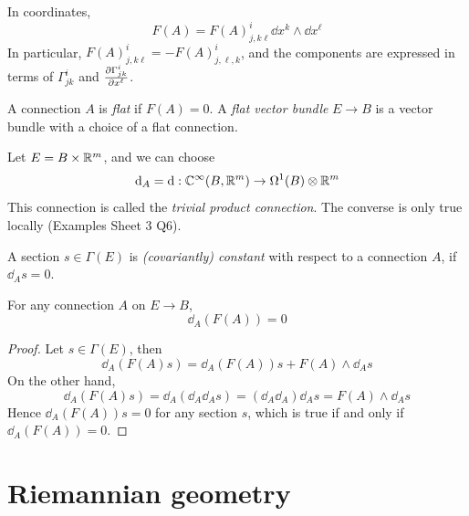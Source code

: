 \documentclass{article}
\begin{document}
In coordinates,
\[F(A) = F(A)^i_{j, k\ell}\dd x^k\wedge \dd x^\ell\]
In particular, \(F(A)^i_{j, k\ell} = -F(A)^i_{j, \ell, k}\), and the components are expressed in terms of \(\Gamma^i_{jk}\) and \(\pdv{\Gamma^i_{jk}}{x^\ell}\).

\lec

\begin{definition}
    [flat] A connection \(A\) is \emph{flat} if \(F(A) = 0\). A \emph{flat vector bundle} \(E \to B\) is a vector bundle with a choice of a flat connection.
\end{definition}

\begin{example}
    Let \(E = B \times \mathbb{R}^m\), and we can choose
    \[\dd_A = \dd : \mathbb{C}^\infty(B, \mathbb{R}^m) \to \Omega^1(B) \otimes \mathbb{R}^m\]
    This connection is called the \emph{trivial product connection}. The converse is only true locally (Examples Sheet 3 Q6).
\end{example}

\begin{definition}
    A section \(s \in \Gamma(E)\) is \emph{(covariantly) constant} with respect to a connection \(A\), if \(\dd_As = 0\).
\end{definition}

\begin{theorem}
     For any connection \(A\) on \(E \to B\),
    \[\dd_A(F(A)) = 0\]
\end{theorem}

\begin{proof}
    Let \(s \in \Gamma(E)\), then
    \[\dd_A(F(A)s) = \dd_A(F(A))s + F(A) \wedge \dd_As\]
    On the other hand,
    \[\dd_A(F(A)s) = \dd_A(\dd_A\dd_As) = (\dd_A\dd_A)\dd_As = F(A)\wedge \dd_As\]
    Hence \(\dd_A(F(A))s = 0\) for any section \(s\), which is true if and only if \(\dd_A(F(A)) = 0\).
\end{proof}

\section{Riemannian geometry}
\end{document}
